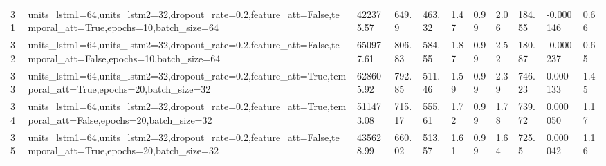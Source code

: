 \begin{longtable}{C{0.8cm} L{2cm} C{1.15cm} C{1.15cm} C{1.15cm} C{1.15cm} C{0.85cm} C{1.25cm} C{1.2cm} C{1.5cm} C{1.0cm}}
31 & units\_lstm1=64,\newline units\_lstm2=32,\newline dropout\_rate=0.2,\newline feature\_att=False,\newline temporal\_att=True,\newline epochs=10,\newline batch\_size=64 & 422375.57 & 649.9 & 463.32 & 1.47 & 0.99 & 2.06 & 184.55 & -0.000146 & 0.66 \\
32 & units\_lstm1=64,\newline units\_lstm2=32,\newline dropout\_rate=0.2,\newline feature\_att=False,\newline temporal\_att=False,\newline epochs=10,\newline batch\_size=64 & 650977.61 & 806.83 & 584.55 & 1.87 & 0.99 & 2.52 & 180.87 & -0.000237 & 0.65 \\
33 & units\_lstm1=64,\newline units\_lstm2=32,\newline dropout\_rate=0.2,\newline feature\_att=True,\newline temporal\_att=True,\newline epochs=20,\newline batch\_size=32 & 628605.92 & 792.85 & 511.46 & 1.59 & 0.99 & 2.39 & 746.23 & 0.000133 & 1.45 \\
34 & units\_lstm1=64,\newline units\_lstm2=32,\newline dropout\_rate=0.2,\newline feature\_att=True,\newline temporal\_att=False,\newline epochs=20,\newline batch\_size=32 & 511473.08 & 715.17 & 555.61 & 1.72 & 0.99 & 1.78 & 739.72 & 0.000050 & 1.17 \\
35 & units\_lstm1=64,\newline units\_lstm2=32,\newline dropout\_rate=0.2,\newline feature\_att=False,\newline temporal\_att=True,\newline epochs=20,\newline batch\_size=32 & 435628.99 & 660.02 & 513.57 & 1.61 & 0.99 & 1.64 & 725.5 & 0.000042 & 1.16 \\

\end{longtable}

